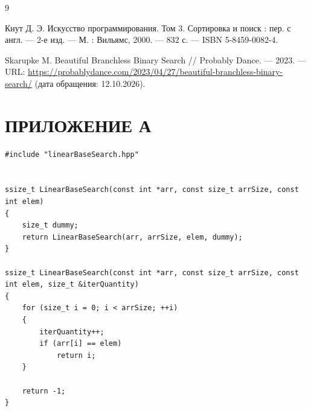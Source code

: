 
\renewcommand{\bibname}{СПИСОК ИСПОЛЬЗОВАННЫХ ИСТОЧНИКОВ}
\begin{thebibliography}{9}
\setlength{\parindent}{1.25cm}
\setlength{\leftmargin}{0pt}
\setlength{\itemindent}{1.25cm}
\setlength{\labelwidth}{0pt}
\setlength{\labelsep}{0.5em}
\raggedright

 Кнут Д. Э. Искусство программирования. Том 3.
Сортировка и поиск : пер. с англ. --- 2-е изд. --- М. :
Вильямс, 2000. --- 832 с. --- ISBN 5-8459-0082-4.

 Skarupke M. Beautiful Branchless Binary Search // Probably Dance. ---
2023. --- URL: \url{https://probablydance.com/2023/04/27/beautiful-branchless-binary-search/} (дата
обращения: 12.10.2026).

\end{thebibliography}

\appendix
\chapter*{ПРИЛОЖЕНИЕ А}

\begin{lstlisting}[style=cpp_listing, caption={Реализация алгоритма линейного поиска}, label={lst:linear_search}]
#include "linearBaseSearch.hpp"


ssize_t LinearBaseSearch(const int *arr, const size_t arrSize, const int elem)
{
    size_t dummy;
    return LinearBaseSearch(arr, arrSize, elem, dummy);
}

ssize_t LinearBaseSearch(const int *arr, const size_t arrSize, const int elem, size_t &iterQuantity)
{
    for (size_t i = 0; i < arrSize; ++i)
    {
        iterQuantity++;
        if (arr[i] == elem)
            return i;
    }

    return -1;
}
\end{lstlisting}

